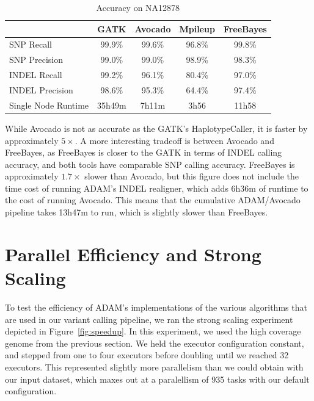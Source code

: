 \documentclass[phd]{ucbthesis}
\begin{document}
\begin{table}[h]
\centering
\caption{Accuracy on NA12878}
\label{tab:accuracy}
\begin{tabular}{ l | c c c c }
\hline
 & GATK & Avocado & Mpileup & FreeBayes \\
\hline
\hline
SNP Recall & 99.9\% & 99.6\% & 96.8\% & 99.8\% \\
SNP Precision & 99.0\% & 99.0\% & 98.9\% & 98.3\% \\
\hline
INDEL Recall & 99.2\% & 96.1\% & 80.4\% & 97.0\% \\
INDEL Precision & 98.6\% & 95.3\% & 64.4\% & 97.4\% \\
\hline
Single Node Runtime & 35h49m & 7h11m & 3h56 & 11h58  \\
\end{tabular}
\end{table}

While Avocado is not as accurate as the GATK's HaplotypeCaller, it is
faster by approximately $5\times$. A more interesting tradeoff is between
Avocado and FreeBayes, as FreeBayes is closer to the GATK in terms of INDEL
calling accuracy, and both tools have comparable SNP calling accuracy.
FreeBayes is approximately $1.7\times$ slower than Avocado, but this figure
does not include the time cost of running ADAM's INDEL realigner, which adds
6h36m of runtime to the cost of running Avocado. This means that the cumulative
ADAM/Avocado pipeline takes 13h47m to run, which is slightly slower than
FreeBayes.

\section{Parallel Efficiency and Strong Scaling}
\label{sec:parallel-efficiency}

To test the efficiency of ADAM's implementations of the various algorithms that
are used in our variant calling pipeline, we ran the strong scaling experiment
depicted in Figure~\ref{fig:speedup}. In this experiment, we used the high
coverage genome from the previous section. We held the executor configuration
constant, and stepped from one to four executors before doubling until we
reached 32 executors. This represented slightly more parallelism than we could
obtain with our input dataset, which maxes out at a paralellism of 935 tasks
with our default configuration.
\end{document}
